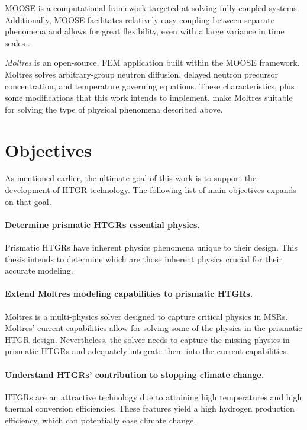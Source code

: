 \gls{MOOSE} \cite{gaston_moose_2009} is a computational framework targeted at solving fully coupled systems.
Additionally, MOOSE facilitates relatively easy coupling between separate phenomena and allows for great flexibility, even with a large variance in time scales \cite{novak_pronghorn_2018}.

\textit{Moltres} is an open-source, \gls{FEM} application built within the \gls{MOOSE} framework.
Moltres solves arbitrary-group neutron diffusion, delayed neutron precursor concentration, and temperature governing equations.
These characteristics, plus some modifications that this work intends to implement, make Moltres suitable for solving the type of physical phenomena described above.

\section{Objectives}

As mentioned earlier, the ultimate goal of this work is to support the development of \gls{HTGR} technology.
The following list of main objectives expands on that goal.

\paragraph{Determine prismatic \glspl{HTGR} essential physics.}
Prismatic HTGRs have inherent physics phenomena unique to their design.
This thesis intends to determine which are those inherent physics crucial for their accurate modeling.

\paragraph{Extend Moltres modeling capabilities to prismatic \glspl{HTGR}.}
Moltres is a multi-physics solver designed to capture critical physics in \glspl{MSR}.
Moltres' current capabilities allow for solving some of the physics in the prismatic HTGR design.
Nevertheless, the solver needs to capture the missing physics in prismatic HTGRs and adequately integrate them into the current capabilities.

\paragraph{Understand HTGRs' contribution to stopping climate change.}
HTGRs are an attractive technology due to attaining high temperatures and high thermal conversion efficiencies. These features yield a high hydrogen production efficiency, which can potentially ease climate change.

